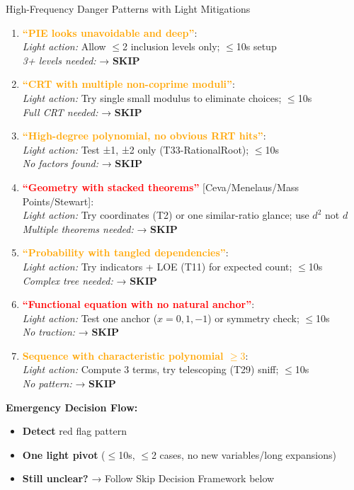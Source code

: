 \documentclass{article}
\begin{document}
\begin{classifybox}{High-Frequency Danger Patterns with Light Mitigations}
\begin{enumerate}[nosep,start=5]
\item \textcolor{orange}{\textbf{``PIE looks unavoidable and deep''}}:\\
  \textit{Light action:} Allow $\leq$2 inclusion levels only; $\leq$10s setup\\
  \textit{3+ levels needed:} → \textbf{SKIP}

\item \textcolor{orange}{\textbf{``CRT with multiple non-coprime moduli''}}:\\
  \textit{Light action:} Try single small modulus to eliminate choices; $\leq$10s\\
  \textit{Full CRT needed:} → \textbf{SKIP}

\item \textcolor{orange}{\textbf{``High-degree polynomial, no obvious RRT hits''}}:\\
  \textit{Light action:} Test ±1, ±2 only (T33-RationalRoot); $\leq$10s\\
  \textit{No factors found:} → \textbf{SKIP}

\item \textcolor{red}{\textbf{``Geometry with stacked theorems''}} [Ceva/Menelaus/Mass Points/Stewart]:\\
  \textit{Light action:} Try coordinates (T2) or one similar-ratio glance; use $d^2$ not $d$\\
  \textit{Multiple theorems needed:} → \textbf{SKIP}

\item \textcolor{orange}{\textbf{``Probability with tangled dependencies''}}:\\
  \textit{Light action:} Try indicators + LOE (T11) for expected count; $\leq$10s\\
  \textit{Complex tree needed:} → \textbf{SKIP}

\item \textcolor{red}{\textbf{``Functional equation with no natural anchor''}}:\\
  \textit{Light action:} Test one anchor ($x=0,1,-1$) or symmetry check; $\leq$10s\\
  \textit{No traction:} → \textbf{SKIP}

\item \textcolor{orange}{\textbf{Sequence with characteristic polynomial $\geq3$}}:\\
  \textit{Light action:} Compute 3 terms, try telescoping (T29) sniff; $\leq$10s\\
  \textit{No pattern:} → \textbf{SKIP}
\end{enumerate}

\textbf{Emergency Decision Flow:}
\begin{itemize}[nosep]
\item[\textbf{1.}] \textbf{Detect} red flag pattern
\item[\textbf{2.}] \textbf{One light pivot} ($\leq$10s, $\leq$2 cases, no new variables/long expansions)  
\item[\textbf{3.}] \textbf{Still unclear?} → Follow Skip Decision Framework below
\end{itemize}
\end{classifybox}
\end{document}
